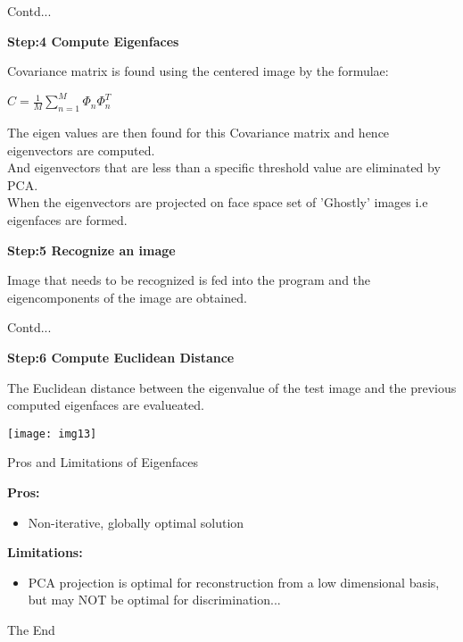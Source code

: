 \documentclass{beamer}
\newcommand\heading[1]{%
  \par\bigskip
  {\Large\bfseries#1}\par\smallskip}
\newcommand\myheading[1]{%
  \par\bigskip
  {\large\bfseries#1}\par\smallskip}
\begin{document}
\begin{frame}{Contd...}
	\begin{flushleft}
		\myheading{Step:4 Compute Eigenfaces}
		Covariance matrix is found using the centered image by the formulae:
	\end{flushleft}
		$ C = \frac{1}{M} \sum_{n=1}^{M}\Phi_n\Phi_n^T$
	\begin{flushleft}
		The eigen values are then found for this Covariance matrix and hence eigenvectors are computed.\\
		\vspace{10pt}
		And eigenvectors that are less than a specific threshold value are eliminated by PCA.\\
		\vspace{10pt}
		When the eigenvectors are projected on face space set of 'Ghostly' images i.e eigenfaces are formed.
		\myheading{Step:5 Recognize an image}
		Image that needs to be recognized is fed into the program and the eigencomponents of the image are obtained.
	\end{flushleft}
\end{frame}

\begin{frame}{Contd...}
	\begin{flushleft}
		\myheading{Step:6 Compute Euclidean Distance}
		The Euclidean distance between the eigenvalue of the test image and the previous computed eigenfaces are evalueated.
	\end{flushleft}
	\texttt{[image: img13]}
\end{frame}

\begin{frame}{Pros and Limitations of Eigenfaces}
	\begin{flushleft}
		\heading{Pros:}
		\begin{itemize}
			\item Non-iterative, globally optimal solution
		\end{itemize}
		\heading{Limitations:}
		\begin{itemize}
			\item PCA projection is optimal for reconstruction from a low dimensional basis, but may NOT be optimal for discrimination...
		\end{itemize}
	\end{flushleft}
\end{frame}

\begin{frame}
\huge{\centerline{The End}}
\end{frame}
\end{document}
